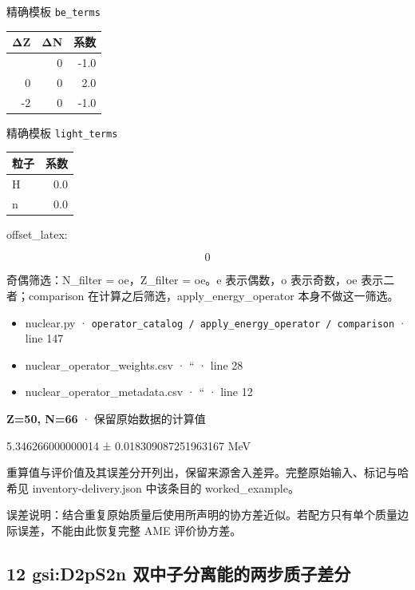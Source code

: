 \documentclass[
  11pt,
  letterpaper,
]{article}
\providecommand{\tightlist}{%
  \setlength{\itemsep}{0pt}\setlength{\parskip}{0pt}}
\begin{document}
精确模板 \texttt{be\_terms}

\begin{longtable}[]{@{}rrr@{}}
\toprule\noalign{}
ΔZ & ΔN & 系数 \\
\midrule\noalign{}
\endhead
\bottomrule\noalign{}
\endlastfoot
2 & 0 & -1.0 \\
0 & 0 & 2.0 \\
-2 & 0 & -1.0 \\
\end{longtable}

精确模板 \texttt{light\_terms}

\begin{longtable}[]{@{}lr@{}}
\toprule\noalign{}
粒子 & 系数 \\
\midrule\noalign{}
\endhead
\bottomrule\noalign{}
\endlastfoot
H & 0.0 \\
n & 0.0 \\
\end{longtable}

offset\_latex:

\[
0
\]

奇偶筛选：N\_filter = oe，Z\_filter = oe。e 表示偶数，o 表示奇数，oe
表示二者；comparison 在计算之后筛选，apply\_energy\_operator
本身不做这一筛选。

\begin{itemize}
\tightlist
\item
  nuclear.py ·
  \texttt{operator\_catalog\ /\ apply\_energy\_operator\ /\ comparison}
  · line 147
\item
  nuclear\_operator\_weights.csv · `` · line 28
\item
  nuclear\_operator\_metadata.csv · `` · line 12
\end{itemize}

\textbf{Z=50, N=66} · 保留原始数据的计算值

5.346266000000014 ± 0.018309087251963167 MeV

重算值与评价值及其误差分开列出，保留来源舍入差异。完整原始输入、标记与哈希见
inventory-delivery.json 中该条目的 worked\_example。

误差说明：结合重复原始质量后使用所声明的协方差近似。若配方只有单个质量边际误差，不能由此恢复完整
AME 评价协方差。

\subsection{12 gsi:D2pS2n
双中子分离能的两步质子差分}\label{gsid2ps2n-ux53ccux4e2dux5b50ux5206ux79bbux80fdux7684ux4e24ux6b65ux8d28ux5b50ux5deeux5206}
\end{document}
